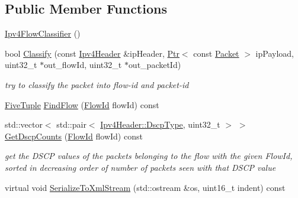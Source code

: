 \subsection*{Public Member Functions}
\begin{DoxyCompactItemize}
\item 
\hyperlink{classns3_1_1Ipv4FlowClassifier_aaba5c92c15d17bca35196a62ecebcb4e}{Ipv4\+Flow\+Classifier} ()
\item 
bool \hyperlink{classns3_1_1Ipv4FlowClassifier_ac91b7a15892c52b4361de76eaf8411b7}{Classify} (const \hyperlink{classns3_1_1Ipv4Header}{Ipv4\+Header} \&ip\+Header, \hyperlink{classns3_1_1Ptr}{Ptr}$<$ const \hyperlink{classns3_1_1Packet}{Packet} $>$ ip\+Payload, uint32\+\_\+t $\ast$out\+\_\+flow\+Id, uint32\+\_\+t $\ast$out\+\_\+packet\+Id)
\begin{DoxyCompactList}\small\item\em try to classify the packet into flow-\/id and packet-\/id \end{DoxyCompactList}\item 
\hyperlink{structns3_1_1Ipv4FlowClassifier_1_1FiveTuple}{Five\+Tuple} \hyperlink{classns3_1_1Ipv4FlowClassifier_acebbcaa758340552bb0dbde00d7963ae}{Find\+Flow} (\hyperlink{group__flow-monitor_ga39a766c4a370cdb9ab8ac85da4b288e9}{Flow\+Id} flow\+Id) const 
\item 
std\+::vector$<$ std\+::pair$<$ \hyperlink{classns3_1_1Ipv4Header_aaa17802e7732a689311b72d48d1a3450}{Ipv4\+Header\+::\+Dscp\+Type}, uint32\+\_\+t $>$ $>$ \hyperlink{classns3_1_1Ipv4FlowClassifier_a6aeabcfb07444976713b0c89f8922fb7}{Get\+Dscp\+Counts} (\hyperlink{group__flow-monitor_ga39a766c4a370cdb9ab8ac85da4b288e9}{Flow\+Id} flow\+Id) const 
\begin{DoxyCompactList}\small\item\em get the D\+S\+CP values of the packets belonging to the flow with the given Flow\+Id, sorted in decreasing order of number of packets seen with that D\+S\+CP value \end{DoxyCompactList}\item 
virtual void \hyperlink{classns3_1_1Ipv4FlowClassifier_a84c7125c44d6e6cf1de03f0fc1e345aa}{Serialize\+To\+Xml\+Stream} (std\+::ostream \&os, uint16\+\_\+t indent) const 
\end{DoxyCompactItemize}
